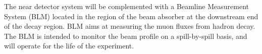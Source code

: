 The near detector system will be complemented with a Beamline Measurement System (BLM) located in the region of the beam absorber at the downstream end of the decay region. BLM aims at measuring the muon fluxes from hadron decay.
The BLM is intended to monitor the beam profile on a spill-by-spill basis, and will operate for the life of the experiment.


